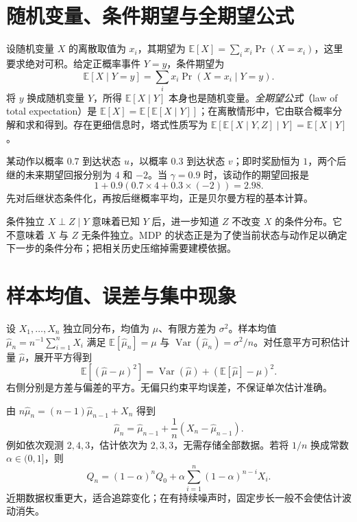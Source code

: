 \documentclass[UTF8,12pt,a4paper,fontset=fandol]{ctexbook}
\begin{document}
\section{随机变量、条件期望与全期望公式}

设随机变量 $X$ 的离散取值为 $x_i$，其期望为 $\mathbb E[X]=\sum_i x_i\Pr(X=x_i)$，这里要求绝对可积。给定正概率事件 $Y=y$，条件期望为
\[
\mathbb E[X\mid Y=y]=\sum_i x_i\Pr(X=x_i\mid Y=y).
\]
将 $y$ 换成随机变量 $Y$，所得 $\mathbb E[X\mid Y]$ 本身也是随机变量。\emph{全期望公式}（law of total expectation）是 $\mathbb E[X]=\mathbb E[\mathbb E[X\mid Y]]$；在离散情形中，它由联合概率分解和求和得到。存在更细信息时，塔式性质写为 $\mathbb E[\mathbb E[X\mid Y,Z]\mid Y]=\mathbb E[X\mid Y]$。

\begin{example}
某动作以概率 $0.7$ 到达状态 $u$，以概率 $0.3$ 到达状态 $v$；即时奖励恒为 $1$，两个后继的未来期望回报分别为 $4$ 和 $-2$。当 $\gamma=0.9$ 时，该动作的期望回报是
\[
1+0.9(0.7\times4+0.3\times(-2))=2.98.
\]
先对后继状态条件化，再按后继概率平均，正是贝尔曼方程的基本计算。
\end{example}

条件独立 $X\perp Z\mid Y$ 意味着已知 $Y$ 后，进一步知道 $Z$ 不改变 $X$ 的条件分布。它不意味着 $X$ 与 $Z$ 无条件独立。MDP 的状态正是为了使当前状态与动作足以确定下一步的条件分布；把相关历史压缩掉需要建模依据。

\section{样本均值、误差与集中现象}

设 $X_1,\ldots,X_n$ 独立同分布，均值为 $\mu$、有限方差为 $\sigma^2$。样本均值 $\widehat\mu_n=n^{-1}\sum_{i=1}^nX_i$ 满足 $\mathbb E[\widehat\mu_n]=\mu$ 与 $\operatorname{Var}(\widehat\mu_n)=\sigma^2/n$。对任意平方可积估计量 $\widehat\mu$，展开平方得到
\[
\mathbb E[(\widehat\mu-\mu)^2]
=\operatorname{Var}(\widehat\mu)+(\mathbb E[\widehat\mu]-\mu)^2.
\]
右侧分别是方差与偏差的平方。无偏只约束平均误差，不保证单次估计准确。

由 $n\widehat\mu_n=(n-1)\widehat\mu_{n-1}+X_n$ 得到
\begin{equation}
\widehat\mu_n=\widehat\mu_{n-1}+\frac1n(X_n-\widehat\mu_{n-1}).
\label{eq:rl-incremental-mean}
\end{equation}
例如依次观测 $2,4,3$，估计依次为 $2,3,3$，无需存储全部数据。若将 $1/n$ 换成常数 $\alpha\in(0,1]$，则
\[
Q_n=(1-\alpha)^nQ_0+\alpha\sum_{i=1}^n(1-\alpha)^{n-i}X_i.
\]
近期数据权重更大，适合追踪变化；在有持续噪声时，固定步长一般不会使估计波动消失。
\end{document}
